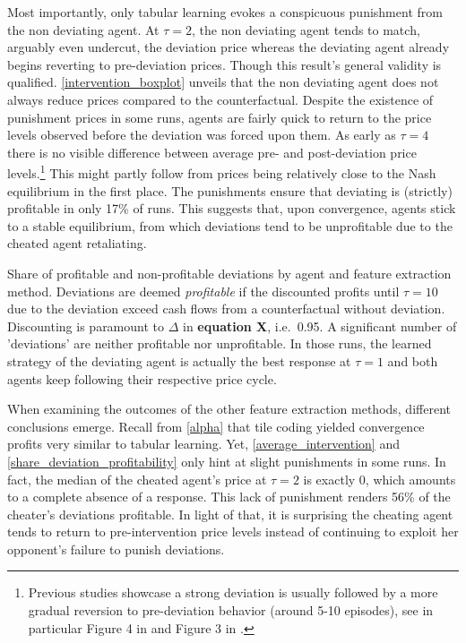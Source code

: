Most importantly, only tabular learning evokes a conspicuous punishment from the non deviating agent. At $\tau = 2$, the non deviating agent tends to match, arguably even undercut, the deviation price whereas the deviating agent already begins reverting to pre-deviation prices. Though this result's general validity is qualified. \autoref{intervention_boxplot} unveils that the non deviating agent does not always reduce prices compared to the counterfactual. Despite the existence of punishment prices in some runs, agents are fairly quick to return to the price levels observed before the deviation was forced upon them. As early as $\tau = 4$ there is no visible difference between average pre- and post-deviation price levels.\footnote{Previous studies showcase a strong deviation is usually followed by a more gradual reversion to pre-deviation behavior (around 5-10 episodes), see in particular Figure 4 in \textcite{calvano_algorithmic_2018} and Figure 3 in \textcite{klein_autonomous_2019}.} This might partly follow from prices being relatively close to the Nash equilibrium in the first place. The punishments ensure that deviating is (strictly) profitable in only 17\% of runs. This suggests that, upon convergence, agents stick to a stable equilibrium, from which deviations tend to be unprofitable due to the cheated agent retaliating.

\begin{center}
	\begin{table}
		
		\caption{Share of profitable and non-profitable deviations by agent and feature extraction method. Deviations are deemed \emph{profitable} if the discounted profits until $\tau = 10$ due to the deviation exceed cash flows from a counterfactual without deviation. Discounting is paramount to $\Delta$ in \textbf{equation X}, i.e.\ 0.95. A significant number of 'deviations' are neither profitable nor unprofitable. In those runs, the learned strategy of the deviating agent is actually the best response at $\tau = 1$ and both agents keep following their respective price cycle.}
		\label{share_deviation_profitability}
	\end{table}
\end{center}

When examining the outcomes of the other feature extraction methods, different conclusions emerge. Recall from \autoref{alpha} that tile coding yielded convergence profits very similar to tabular learning. Yet, \autoref{average_intervention} and \autoref{share_deviation_profitability} only hint at slight punishments in some runs. In fact, the median of the cheated agent's price at $\tau = 2$ is exactly 0, which amounts to a complete absence of a response. This lack of punishment renders 56\% of the cheater's deviations profitable. In light of that, it is surprising the cheating agent tends to return to pre-intervention price levels instead of continuing to exploit her opponent's failure to punish deviations.

